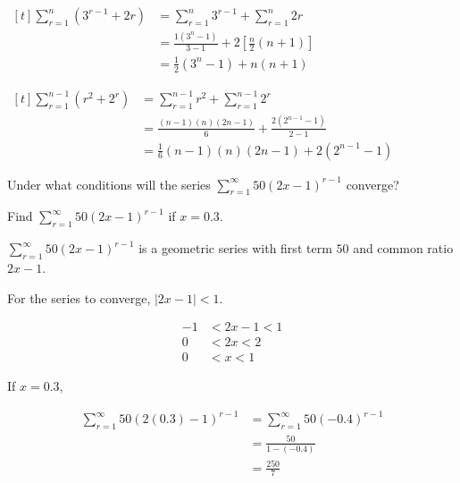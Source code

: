 \documentclass[11pt,a4paper]{book}
\begin{document}
\begin{example}
\begin{tasks}[label=(\alph*),label-width=3.5ex]
\task
$
\begin{aligned}[t]
\sum_{r=1}^{n}\left(3^{r-1}+2r\right) & =\sum_{r=1}^{n}3^{r-1}+\sum_{r=1}^{n}2r\\
 & =\frac{1\left(3^{n}-1\right)}{3-1}+2\left[\frac{n}{2}\left(n+1\right)\right]\\
 & =\frac{1}{2}\left(3^{n}-1\right)+n\left(n+1\right)
\end{aligned}
$

\task
$
\begin{aligned}[t]
\sum_{r=1}^{n-1}\left(r^{2}+2^{r}\right) & =\sum_{r=1}^{n-1}r^{2}+\sum_{r=1}^{n-1}2^{r}\\
 & =\frac{\left(n-1\right)\left(n\right)\left(2n-1\right)}{6}+\frac{2\left(2^{n-1}-1\right)}{2-1}\\
 & =\frac{1}{6}\left(n-1\right)\left(n\right)\left(2n-1\right)+2\left(2^{n-1}-1\right)
\end{aligned}
$

\end{tasks}

\end{example}

\newpage

\begin{example}

Under what conditions will the series ${\displaystyle \sum_{r=1}^{\infty}50\left(2x-1\right)^{r-1}}$ converge?

Find ${\displaystyle \sum_{r=1}^{\infty}50\left(2x-1\right)^{r-1}}$
if $x=0.3$.

\Solution

${\displaystyle \sum_{r=1}^{\infty}50\left(2x-1\right)^{r-1}}$ is
a geometric series with first term $50$ and common ratio $2x-1$.

For the series to converge, $\left|2x-1\right|<1$.

\begin{align*}
-1 & <2x-1<1\\
0 & <2x<2\\
0 & <x<1
\end{align*}

If $x=0.3$,

\begin{align*}
{\displaystyle \sum_{r=1}^{\infty}50\left(2\left(0.3\right)-1\right)^{r-1}} & =\sum_{r=1}^{\infty}50\left(-0.4\right)^{r-1}\\
 & =\frac{50}{1-\left(-0.4\right)}\\
 & =\frac{250}{7}
\end{align*}

\end{example}
\end{document}
